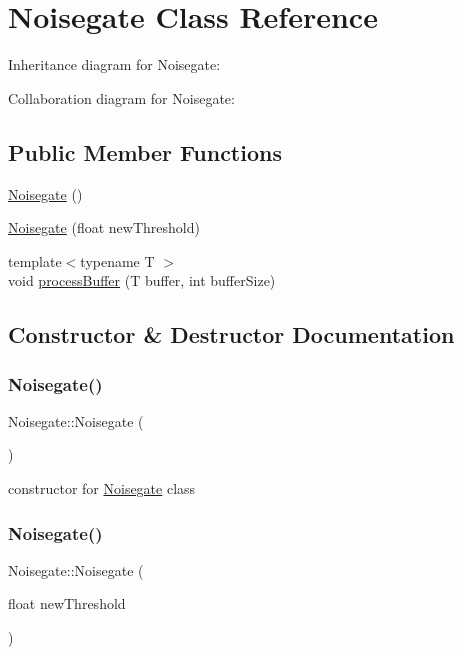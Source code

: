 \hypertarget{classNoisegate}{}\section{Noisegate Class Reference}
\label{classNoisegate}


Inheritance diagram for Noisegate\+:


Collaboration diagram for Noisegate\+:
\subsection*{Public Member Functions}
\begin{DoxyCompactItemize}
\item 
\hyperlink{classNoisegate_a15c5621437e7378814c69a58fc60b326}{Noisegate} ()
\item 
\hyperlink{classNoisegate_a4dc5881a80f29ebc6e9be12dae2bd632}{Noisegate} (float new\+Threshold)
\item 
{\footnotesize template$<$typename T $>$ }\\void \hyperlink{classNoisegate_aee5ff92d38286e509055fa6d117415fd}{process\+Buffer} (T buffer, int buffer\+Size)
\end{DoxyCompactItemize}


\subsection{Constructor \& Destructor Documentation}
\mbox{\label{classNoisegate_a15c5621437e7378814c69a58fc60b326}} 
\subsubsection{\texorpdfstring{Noisegate()}{Noisegate()}\hspace{0.1cm}{\footnotesize\ttfamily [1/2]}}
{\footnotesize\ttfamily Noisegate\+::\+Noisegate (\begin{DoxyParamCaption}{ }\end{DoxyParamCaption})}

constructor for \hyperlink{classNoisegate}{Noisegate} class \mbox{\label{classNoisegate_a4dc5881a80f29ebc6e9be12dae2bd632}} 
\subsubsection{\texorpdfstring{Noisegate()}{Noisegate()}\hspace{0.1cm}{\footnotesize\ttfamily [2/2]}}
{\footnotesize\ttfamily Noisegate\+::\+Noisegate (\begin{DoxyParamCaption}\item[{float}]{new\+Threshold }\end{DoxyParamCaption})}

